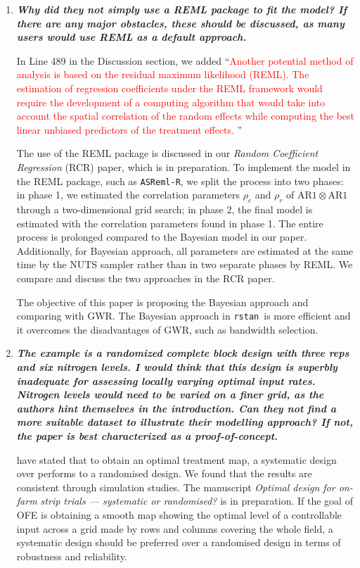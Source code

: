 \documentclass[a4paper]{article}   	%
\newcommand{\asreml}{\texttt{ASReml-R}}
\newcommand{\rstan}{\texttt{rstan}}
\newcommand{\AR}{\mathrm{AR}1}
\newcommand{\qtitle}[1]{\textit{\textbf{#1}}}
\begin{document}
\begin{enumerate}
    \item \qtitle{Why did they not simply use a REML package to fit the model? If there are any major obstacles, these should be discussed, as many users would use REML as a default approach.}
    
    In Line 489 in the Discussion section, we added ``\textcolor{red}{Another potential method of analysis is based on the residual maximum likelihood (REML). The estimation of regression coefficients under the REML framework would require the development of a computing algorithm that would take into account the spatial correlation of the random effects while computing the best linear unbiased predictors of the treatment effects. }''
    
    The use of the REML package is discussed in our \textit{Random Coefficient Regression} (RCR) paper, which is in preparation. To implement the model in the REML package, such as \asreml, we split the process into two phases: in phase 1, we estimated the correlation parameters $\rho_c$ and $\rho_r$ of $\AR\otimes\AR$ through a two-dimensional grid search; in phase 2, the final model is estimated with the correlation parameters found in phase 1. The entire process is prolonged compared to the Bayesian model in our paper. Additionally, for Bayesian approach, all parameters are estimated at the same time by the NUTS sampler rather than in two separate phases by REML. We compare and discuss the two approaches in the RCR paper. 
    
    The objective of this paper is proposing the Bayesian approach and comparing with GWR. The Bayesian approach in \rstan\ is more efficient and it overcomes the disadvantages of GWR, such as bandwidth selection. 
    
    \item \qtitle{The example is a randomized complete block design with three reps and six nitrogen levels. I would think that this design is superbly inadequate for assessing locally varying optimal input rates. Nitrogen levels would need to be varied on a finer grid, as the authors hint themselves in the introduction. Can they not find a more suitable dataset to illustrate their modelling approach? If not, the paper is best characterized as a proof-of-concept.}
    
	\textcite{Piepho2011Statistical, Pringle2004FieldScale} have stated that to obtain an optimal treatment map, a systematic design over performs to a randomised design. We found that the results are consistent through simulation studies. The manuscript \textit{Optimal design for on-farm strip trials --- systematic or randomised?} is in preparation. If the goal of OFE is obtaining a smooth map showing the optimal level of a controllable input across a grid made by rows and columns covering the whole field, a systematic design should be preferred over a randomised design in terms of robustness and reliability. 
	

\end{enumerate}
\end{document}
